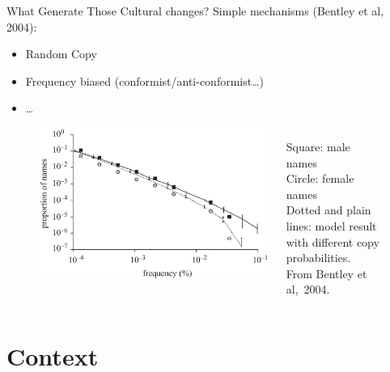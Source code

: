 \documentclass[12pt, handout=show,notes=show]{beamer}
\begin{document}
\begin{frame}{What Generate Those Cultural changes?}
	Simple mechanisms (Bentley et al, 2004):
	\begin{itemize}
		\item Random Copy 
		\item Frequency biased (conformist/anti-conformist\dots)
		\item \dots	
	\end{itemize}
	\begin{figure}
		\begin{columns}
			\begin{column}{.8\textwidth}
				\centering
				\includegraphics[width=.6\textwidth]{images/powerlawrepartition.jpg}
			\end{column}
			\begin{column}{.3\textwidth}
				\tiny
				Square: male names\\
				Circle: female names\\
				Dotted and plain lines: model result with different copy probabilities.\\
			From Bentley et al,~2004.
			\end{column}
		\end{columns}
	\end{figure}
\end{frame}

\section{Context}
\end{document}
